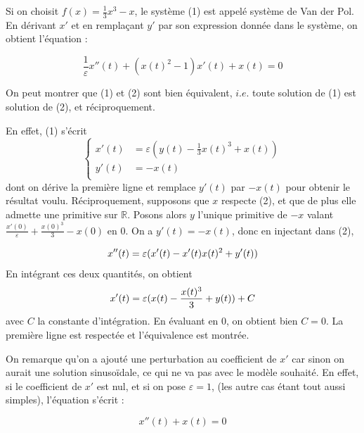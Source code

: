 \documentclass{article}
\begin{document}
Si on choisit \(f(x) = \frac{1}{3} x^3 - x\), le système (1) est appelé système de Van der Pol. En dérivant $x'$ et en remplaçant $y'$ par son expression donnée dans le système, on obtient l'équation :

\begin{equation}
    \frac{1}{\varepsilon} x''(t) + (x(t)^2 -1)x'(t) + x(t) = 0
\end{equation}

On peut montrer que (1) et (2) sont bien équivalent, $i.e.$ toute solution de (1) est solution de (2), et réciproquement.

En effet, (1) s'écrit
\begin{equation*}
    \left\{
    \begin{aligned}
        x'(t) &= \varepsilon (y(t) - \frac{1}{3} x(t)^3 + x(t)) \\   
        y'(t) &= -x(t)\\
   \end{aligned}
   \right.
\end{equation*}
dont on dérive la première ligne et remplace \(y'(t) \) par \( -x(t) \) pour obtenir le résultat voulu.
Réciproquement, supposons que \(x\) respecte (2), et que de plus elle admette une primitive sur $\mathbb{R}$. Posons alors $y$ l'unique primitive de $-x$ valant $\frac{x'(0)}{\varepsilon} 
+ \frac{x(0)^3}{3} - x(0)$ en $0$.
On a $y'(t) = -x(t)$, donc en injectant dans (2),

\begin{equation*}
    x''(t) = \varepsilon (x'(t) - x'(t)x(t)^2 + y'(t)) \\
\end{equation*}
En intégrant ces deux quantités, on obtient
\begin{equation*}
    x'(t) = \varepsilon (x(t) - \frac{x(t)^3}{3} + y(t)) + C \\
\end{equation*}
avec $C$ la constante d'intégration. En évaluant en 0, on obtient bien $C = 0$. La première ligne est respectée et l'équivalence est montrée.

\medskip

On remarque qu'on a ajouté une perturbation au coefficient de $x'$ car sinon on aurait une solution sinusoïdale, ce qui ne va pas avec le modèle souhaité. En effet, si le coefficient de $x'$ est nul, et si on pose $\varepsilon = 1$, (les autre cas étant tout aussi simples), l'équation s'écrit :

\begin{equation*}
    x''(t) + x(t) = 0
\end{equation*}
\end{document}
